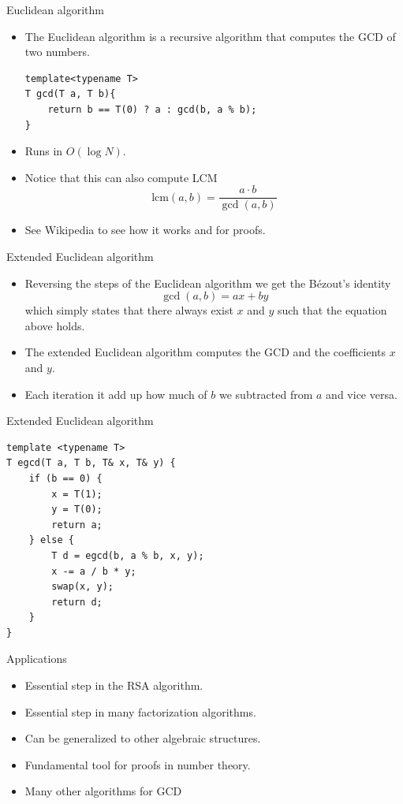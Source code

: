 \documentclass{beamer}
\begin{document}
\begin{frame}{Euclidean algorithm}
  \vspace{20pt}
  \begin{itemize}
    \item The Euclidean algorithm is a recursive algorithm that computes the GCD of two numbers.
      \begin{verbatim}
template<typename T>
T gcd(T a, T b){
    return b == T(0) ? a : gcd(b, a % b);
}
    \end{verbatim}
    \item Runs in $O(\log N)$.
    \item Notice that this can also compute LCM
      \[
        \text{lcm}(a, b) = \frac{a\cdot b}{\gcd(a,b)}
      \]
    \item See Wikipedia to see how it works and for proofs.
  \end{itemize}
\end{frame}

\begin{frame}[plain]{Extended Euclidean algorithm}
  \vspace{20pt}
  \begin{itemize}
    \item Reversing the steps of the Euclidean algorithm we get the B\'ezout's identity
      \[
        \gcd(a, b) = ax + by
      \]
    which simply states that there always exist $x$ and $y$ such that the equation above holds.
    \item The extended Euclidean algorithm computes the GCD and the coefficients $x$ and $y$.
    \item Each iteration it add up how much of $b$ we subtracted from $a$ and vice versa.
  \end{itemize}
\end{frame}

\begin{frame}{Extended Euclidean algorithm}
  \vspace{10pt}
    \begin{verbatim}
template <typename T>
T egcd(T a, T b, T& x, T& y) {
    if (b == 0) {
        x = T(1);
        y = T(0);
        return a;
    } else {
        T d = egcd(b, a % b, x, y);
        x -= a / b * y;
        swap(x, y);
        return d;
    }
}
    \end{verbatim}
\end{frame}

\begin{frame}[plain]{Applications}
  \vspace{40pt}
  \begin{itemize}
    \item Essential step in the RSA algorithm.
    \item Essential step in many factorization algorithms.
    \item Can be generalized to other algebraic structures.
    \item Fundamental tool for proofs in number theory.
    \item Many other algorithms for GCD
  \end{itemize}
\end{frame}
\end{document}
